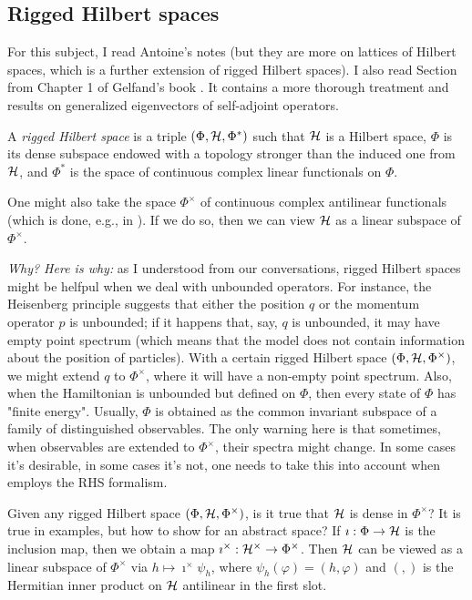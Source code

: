 \subsection{Rigged Hilbert spaces}
For this subject, I read Antoine's notes \cite{antoine} (but they are more on lattices of Hilbert spaces, which is a further extension of rigged Hilbert spaces). I also read Section  from Chapter 1 of Gelfand's book \cite{gelfand}. It contains a more thorough treatment and results on generalized eigenvectors of self-adjoint operators.

\begin{definition}
A \emph{rigged Hilbert space} is a triple $(\Phi,\mathcal{H},\Phi^*)$ such that $\mathcal{H}$ is a Hilbert space, $\Phi$ is its dense subspace endowed with a topology stronger than the induced one from $\mathcal{H}$, and $\Phi^*$ is the space of continuous complex linear functionals on $\Phi$.
\end{definition}
One might also take the space $\Phi^\times$ of continuous complex antilinear functionals (which is done, e.g., in \cite{antoine}). If we do so, then we can view $\mathcal{H}$ as a linear subspace of $\Phi^\times$.

\emph{Why? Here is why:} as I understood from our conversations, rigged Hilbert spaces might be helfpul when we deal with unbounded operators. For instance, the Heisenberg principle suggests that either the position $q$ or the momentum operator $p$ is unbounded; if it happens that, say, $q$ is unbounded, it may have empty point spectrum (which means that the model does not contain information about the position of particles). With a certain rigged Hilbert space $(\Phi,\mathcal{H},\Phi^\times)$, we might extend $q$ to $\Phi^\times$, where it will have a non-empty point spectrum. Also, when the Hamiltonian is unbounded but defined on $\Phi$, then every state of $\Phi$ has "finite energy". Usually, $\Phi$ is obtained as the common invariant subspace of a family of distinguished observables. The only warning here is that sometimes, when observables are extended to $\Phi^\times$, their spectra might change. In some cases it's desirable, in some cases it's not, one needs to take this into account when employs the RHS formalism.
\begin{quest}
Given any rigged Hilbert space $(\Phi,\mathcal{H},\Phi^\times)$, is it true that $\mathcal{H}$ is dense in $\Phi^\times$? It is true in examples, but how to show for an abstract space? If $\imath : \Phi \rightarrow \mathcal{H}$ is the inclusion map, then we obtain a map $\imath^\times : \mathcal{H}^\times \rightarrow \Phi^\times$. Then $\mathcal{H}$ can be viewed as a linear subspace of $\Phi^\times$ via $h \mapsto \imath^\times\psi_h$, where $\psi_h(\varphi) = (h,\varphi)$ and $(,)$ is the Hermitian inner product on $\mathcal{H}$ antilinear in the first slot.
\end{quest}

